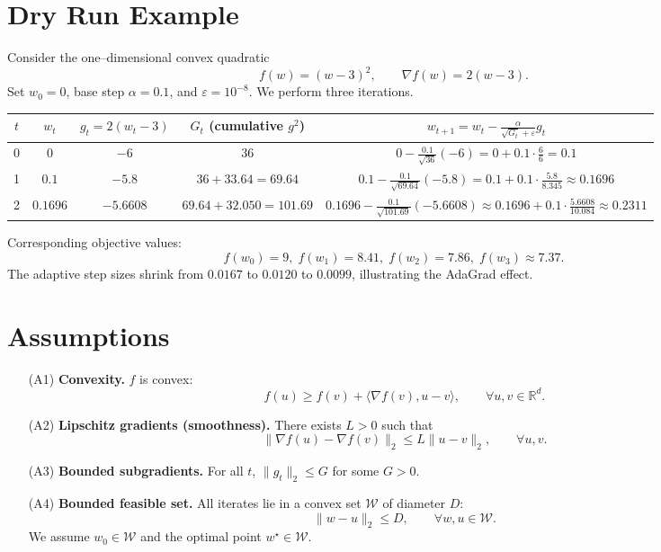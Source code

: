 \documentclass{article}
\begin{document}
\section*{Dry Run Example}
Consider the one–dimensional convex quadratic
\[
f(w)=(w-3)^2,\qquad \nabla f(w)=2(w-3).
\]
Set $w_0=0$, base step $\alpha=0.1$, and $\varepsilon=10^{-8}$.
We perform three iterations.

\begin{center}
\begin{tabular}{c|c|c|c|c}
$t$ & $w_t$ & $g_t=2(w_t-3)$ & $G_t$ (cumulative $g^2$) & $w_{t+1}=w_t-\frac{\alpha}{\sqrt{G_t}+\varepsilon}g_t$\\\hline
0 & $0$ & $-6$ & $36$ & $0-\frac{0.1}{\sqrt{36}}(-6)=0+0.1\cdot\frac{6}{6}=0.1$\\
1 & $0.1$ & $-5.8$ & $36+33.64=69.64$ &
$0.1-\frac{0.1}{\sqrt{69.64}}(-5.8)
=0.1+0.1\cdot\frac{5.8}{8.345}\approx0.1696$\\
2 & $0.1696$ & $-5.6608$ &
$69.64+32.050=101.69$ &
$0.1696-\frac{0.1}{\sqrt{101.69}}(-5.6608)
\approx0.1696+0.1\cdot\frac{5.6608}{10.084}\approx0.2311$
\end{tabular}
\end{center}

Corresponding objective values:
\[
f(w_0)=9,\; f(w_1)=8.41,\; f(w_2)=7.86,\; f(w_3)\approx7.37.
\]
The adaptive step sizes shrink from $0.0167$ to $0.0120$ to $0.0099$,
illustrating the AdaGrad effect.

\section*{Assumptions}
\begin{enumerate}
\item[(A1)] \textbf{Convexity.} $f$ is convex:
\[
f(u)\ge f(v)+\langle\nabla f(v),u-v\rangle,\qquad\forall u,v\in\mathbb{R}^d.
\]

\item[(A2)] \textbf{Lipschitz gradients (smoothness).}
There exists $L>0$ such that
\[
\|\nabla f(u)-\nabla f(v)\|_2\le L\|u-v\|_2,\qquad\forall u,v.
\]

\item[(A3)] \textbf{Bounded subgradients.}
For all $t$, $\|g_t\|_2\le G$ for some $G>0$.

\item[(A4)] \textbf{Bounded feasible set.}
All iterates lie in a convex set $\mathcal{W}$ of diameter $D$:
\[
\|w-u\|_2\le D,\qquad\forall w,u\in\mathcal{W}.
\]
We assume $w_0\in\mathcal{W}$ and the optimal point $w^\star\in\mathcal{W}$.
\end{enumerate}
\end{document}
